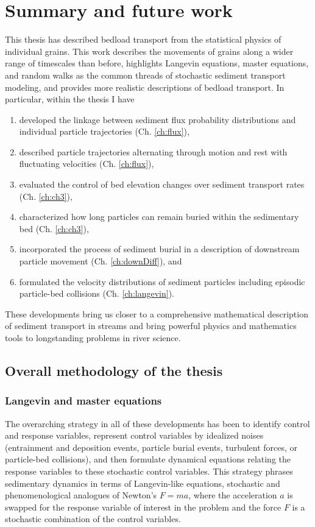 
\chapter{Summary and future work}
\label{ch:conc}

This thesis has described bedload transport from the statistical physics of individual grains.
This work describes the movements of grains along a wider range of timescales than before, highlights Langevin equations, master equations, and random walks as the common threads of stochastic sediment transport modeling, and provides more realistic descriptions of bedload transport. In particular, within the thesis I have
\begin{enumerate}
	\item developed the linkage between sediment flux probability distributions and individual particle trajectories (Ch. \ref{ch:flux}), 
	\item described particle trajectories alternating through motion and rest with fluctuating velocities (Ch. \ref{ch:flux}),
	\item evaluated the control of bed elevation changes over sediment transport rates (Ch. \ref{ch:ch3}),
	\item characterized how long particles can remain buried within the sedimentary bed (Ch. \ref{ch:ch3}),
	\item incorporated the process of sediment burial in a description of downstream particle movement (Ch. \ref{ch:downDiff}), and
	\item formulated the velocity distributions of sediment particles including episodic particle-bed collisions (Ch. \ref{ch:langevin}).
\end{enumerate}
These developments bring us closer to a comprehensive mathematical description of sediment transport in streams and bring powerful physics and mathematics tools to longstanding problems in river science.

\section{Overall methodology of the thesis}

\subsection{Langevin and master equations}

The overarching strategy in all of these developments has been to identify control and response variables, represent control variables by idealized noises (entrainment and deposition events, particle burial events, turbulent forces, or particle-bed collisions), and then formulate dynamical equations relating the response variables to these stochastic control variables.
This strategy phrases sedimentary dynamics in terms of Langevin-like equations, stochastic and phenomenological analogues of Newton's $F=ma$, where the acceleration $a$ is swapped for the response variable of interest in the problem and the force $F$ is a stochastic combination of the control variables. 

